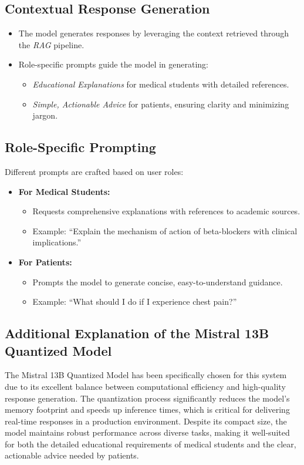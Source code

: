\subsection{Contextual Response Generation}
\label{subsec:mistral_response}
\begin{itemize}
    \item The model generates responses by leveraging the context retrieved through the \emph{RAG} pipeline.
    \item Role-specific prompts guide the model in generating:
        \begin{itemize}
            \item \emph{Educational Explanations} for medical students with detailed references.
            \item \emph{Simple, Actionable Advice} for patients, ensuring clarity and minimizing jargon.
        \end{itemize}
\end{itemize}
\vspace{2cm}
\subsection{Role-Specific Prompting}
\label{subsec:mistral_prompting}
Different prompts are crafted based on user roles:
\begin{itemize}[itemsep=2em]
    \item \textbf{For Medical Students:}
        \begin{itemize}
            \item Requests comprehensive explanations with references to academic sources.
            \item Example: “Explain the mechanism of action of beta-blockers with clinical implications.”
        \end{itemize}
    \item \textbf{For Patients:}
        \begin{itemize}
            \item Prompts the model to generate concise, easy-to-understand guidance.
            \item Example: “What should I do if I experience chest pain?”
        \end{itemize}
\end{itemize}

\subsection{Additional Explanation of the Mistral 13B Quantized Model}
\label{subsec:mistral_explanation}
The Mistral 13B Quantized Model has been specifically chosen for this system due to its excellent balance between computational efficiency and high-quality response generation. The quantization process significantly reduces the model’s memory footprint and speeds up inference times, which is critical for delivering real-time responses in a production environment. Despite its compact size, the model maintains robust performance across diverse tasks, making it well-suited for both the detailed educational requirements of medical students and the clear, actionable advice needed by patients.

